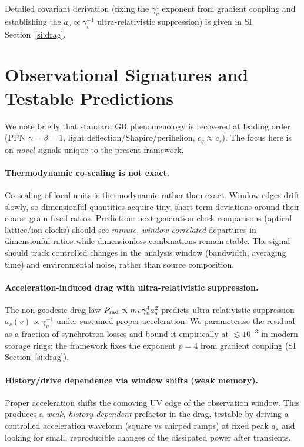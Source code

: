 \documentclass[11pt]{article}
\begin{document}
\noindent Detailed covariant derivation (fixing the $\gamma_v^{4}$ exponent from gradient coupling and establishing the $a_s\propto\gamma_v^{-1}$ ultra-relativistic suppression) is given in SI Section~\ref{si:drag}.

\section{Observational Signatures and Testable Predictions}
We note briefly that standard GR phenomenology is recovered at leading order (PPN $\gamma=\beta=1$, light deflection/Shapiro/perihelion, $c_g\approx c_s$). The focus here is on \emph{novel} signals unique to the present framework.

\paragraph{Thermodynamic co-scaling is not exact.} Co-scaling of local units is thermodynamic rather than exact. Window edges drift slowly, so dimensionful quantities acquire tiny, short-term deviations around their coarse-grain fixed ratios. Prediction: next-generation clock comparisons (optical lattice/ion clocks) should see \emph{minute, window-correlated} departures in dimensionful ratios while dimensionless combinations remain stable. The signal should track controlled changes in the analysis window (bandwidth, averaging time) and environmental noise, rather than source composition.

\paragraph{Acceleration-induced drag with ultra-relativistic suppression.} The non-geodesic drag law $P_{\rm rad}\propto m v \gamma_v^4 a_s^2$ predicts ultra-relativistic suppression $a_s(v)\propto\gamma_v^{-1}$ under sustained proper acceleration. We parameterise the residual as a fraction of synchrotron losses and bound it empirically at $\lesssim 10^{-3}$ in modern storage rings; the framework fixes the exponent $p=4$ from gradient coupling (SI Section~\ref{si:drag}).

\paragraph{History/drive dependence via window shifts (weak memory).} Proper acceleration shifts the comoving UV edge of the observation window. This produces a \emph{weak, history-dependent} prefactor in the drag, testable by driving a controlled acceleration waveform (square vs chirped ramps) at fixed peak $a_s$ and looking for small, reproducible changes of the dissipated power after transients.
\end{document}
